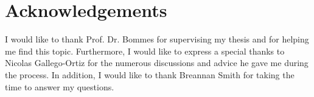 \chapter*{Acknowledgements}
I would like to thank Prof. Dr. Bommes for supervising my thesis and for helping me find this topic. Furthermore, I would like to express a special thanks to Nicolas Gallego-Ortiz for the numerous discussions and advice he gave me during the process. In addition, I would like to thank Breannan Smith for taking the time to answer my questions.